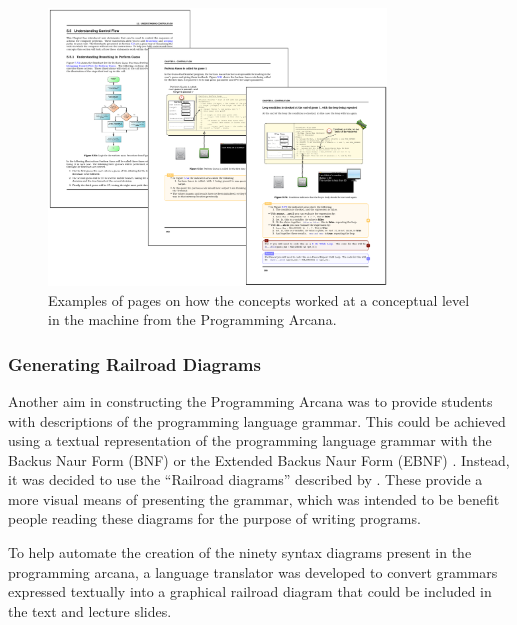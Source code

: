 \begin{figure}[h]
  \centering
  \includegraphics[width=0.8\textwidth]{ArcanaUnderstand}
  \caption{Examples of pages on how the concepts worked at a conceptual level in the machine from the Programming Arcana.}
  \label{fig:arcana_understanding}
\end{figure}

\clearpage





\subsubsection{Generating Railroad Diagrams} %
\label{ssub:railroad_diagrams}

Another aim in constructing the Programming Arcana was to provide students with descriptions of the programming language grammar. This could be achieved using a textual representation of the programming language grammar with the Backus Naur Form (BNF) \cite{Backus:1959} or the Extended Backus Naur Form (EBNF) \cite{Wirth:1977}. Instead, it was decided to use the ``Railroad diagrams'' described by \citet{Braz:1990}. These provide a more visual means of presenting the grammar, which was intended to be benefit people reading these diagrams for the purpose of writing programs.

To help automate the creation of the ninety syntax diagrams present in the programming arcana, a language translator was developed to convert grammars expressed textually into a graphical railroad diagram that could be included in the text and lecture slides. 

